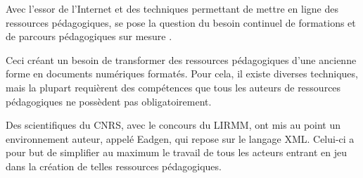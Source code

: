 Avec l'essor de l'Internet et des techniques permettant de mettre
en ligne des ressources pédagogiques, se pose la question du besoin
continuel de formations et de parcours pédagogiques \og sur mesure \fg.

Ceci créant un besoin de transformer des ressources pédagogiques d'une ancienne forme en documents numériques formatés. Pour cela, il
existe diverses techniques, mais la plupart requièrent des compétences que tous les auteurs de ressources
pédagogiques ne possèdent pas obligatoirement. 

Des scientifiques du CNRS, avec le concours du LIRMM, ont mis
au point un environnement auteur, appelé Eadgen, qui repose sur le langage XML. Celui-ci a pour but
de simplifier au maximum le travail de tous les acteurs entrant en jeu dans la création de telles ressources pédagogiques.